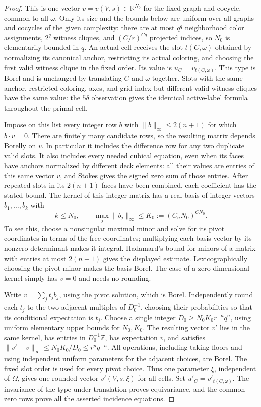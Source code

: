 \begin{proof}
This is one vector \(v=v(V,s)\in\mathbb R^{N_0}\) for the fixed graph
and cocycle, common to all \(\omega\).  Only its size and the bounds
below are uniform over all graphs and cocycles of the given complexity:
there are at most \(q^q\) neighborhood color assignments, \(2^q\)
witness cliques, and \((C/r)^{Cq}\) projected indices, so \(N_0\) is
elementarily bounded in \(q\).  An actual cell receives the slot
\(t(C,\omega)\) obtained by normalizing its canonical anchor, restricting
its actual coloring, and choosing the first valid witness clique in the
fixed order.  Its value is \(u_C=v_{t(C,\omega)}\).  This type is Borel
and is unchanged by translating \(C\) and \(\omega\) together.  Slots
with the same anchor, restricted coloring, axes, and grid index but
different valid witness cliques have the same value: the
\(5\delta\) observation gives the identical active-label formula
throughout the primal cell.

Impose on this list every integer row \(b\) with
\(\|b\|_\infty\leq2(n+1)\) for which \(b\cdot v=0\).  There are
finitely many candidate rows, so the resulting matrix depends Borelly
on \(v\).  In particular it includes the difference row for any two
duplicate valid slots.  It also includes every needed cubical equation,
even when its faces have anchors normalized by different deck elements:
all their values are entries of this same vector \(v\), and Stokes gives
the signed zero sum of those entries.  After repeated slots in its
\(2(n+1)\) faces have been combined, each coefficient has the stated
bound.  The kernel of this
integer matrix has a real basis of integer vectors \(b_1,\ldots,b_k\)
with
\[
                   k\leq N_0,\qquad
        \max_j\|b_j\|_\infty\leq K_0:=(C_nN_0)^{C N_0}.
\]
To see this, choose a nonsingular maximal minor and solve for its pivot
coordinates in terms of the free coordinates; multiplying each basis
vector by its nonzero determinant makes it integral.  Hadamard's
bound for minors of a matrix with entries at most \(2(n+1)\) gives
the displayed estimate.  Lexicographically choosing the pivot minor
makes the basis Borel.  The case of a zero-dimensional kernel simply
has \(v=0\) and needs no rounding.

Write \(v=\sum_j t_jb_j\), using the pivot solution, which is Borel.
Independently round each \(t_j\) to the two adjacent multiples of
\(D_0^{-1}\), choosing their probabilities so that its conditional
expectation is \(t_j\).  Choose a single integer
\(D_0\geq N_0K_0r^{-n}q^n\), using uniform elementary upper bounds
for \(N_0,K_0\).  The resulting vector \(v'\) lies in the same
kernel, has entries in \(D_0^{-1}\mathbb Z\), has expectation \(v\),
and satisfies \(\|v'-v\|_\infty\leq N_0K_0/D_0\leq r^nq^{-n}\).
All operations, including taking floors and using independent uniform
parameters for the adjacent choices, are Borel.  The fixed slot order
is used for every pivot choice.  Thus one parameter \(\xi\), independent
of \(\Omega\), gives one rounded vector \(v'(V,s,\xi)\) for all cells.
Set \(u'_C=v'_{t(C,\omega)}\).  The invariance of the type under
translation proves equivariance, and the common zero rows prove all
the asserted incidence equations.
\end{proof}

